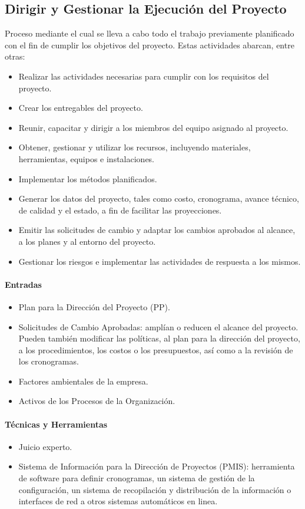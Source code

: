 \documentclass[a4paper,twosides]{article}
\newlength{\wideitemsep}
\let\olditem\item
\renewcommand{\item}{\setlength{\itemsep}{\wideitemsep}\olditem}
\begin{document}
\subsection{Dirigir y Gestionar la Ejecución del Proyecto} \label{sec:gestionar_ejecucion_proyecto}
Proceso mediante el cual se lleva a cabo todo el trabajo previamente planificado con el fin de cumplir los objetivos del proyecto.
Estas actividades abarcan, entre otras:
\begin{itemize}
\item Realizar las actividades necesarias para cumplir con los requisitos del proyecto.
\item Crear los entregables del proyecto.
\item Reunir, capacitar y dirigir a los miembros del equipo asignado al proyecto.
\item Obtener, gestionar y utilizar los recursos, incluyendo materiales, herramientas, equipos e instalaciones.
\item Implementar los métodos planificados.
\item Generar los datos del proyecto, tales como costo, cronograma, avance técnico, de calidad y el estado, a fin de facilitar las proyecciones.
\item Emitir las solicitudes de cambio y adaptar los cambios aprobados al alcance, a los planes y al entorno del proyecto.
\item Gestionar los riesgos e implementar las actividades de respuesta a los mismos.
\end{itemize}
\paragraph{Entradas}
\begin{itemize}
\item Plan para la Dirección del Proyecto (PP).
\item Solicitudes de Cambio Aprobadas: amplían o reducen el alcance del proyecto. Pueden también modificar las políticas, al plan para la dirección del proyecto, a los procedimientos, los costos o los presupuestos, así como a la revisión de los cronogramas.
\item Factores ambientales de la empresa.
\item Activos de los Procesos de la Organización.
\end{itemize}
\paragraph{Técnicas y Herramientas}
\begin{itemize}
\item Juicio experto.
\item Sistema de Información para la Dirección de Proyectos (PMIS): herramienta de software para definir cronogramas, un sistema de gestión de la configuración, un sistema de recopilación y distribución de la información o interfaces de red a otros sistemas automáticos en linea.
\end{itemize}
\end{document}
